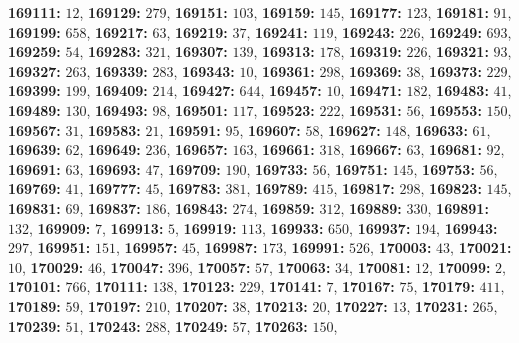 \textsf{\bfseries 169111:} $12$, \textsf{\bfseries 169129:} $279$, \textsf{\bfseries 169151:} $103$, \textsf{\bfseries 169159:} $145$, \textsf{\bfseries 169177:} $123$, \textsf{\bfseries 169181:} $91$, \textsf{\bfseries 169199:} $658$, \textsf{\bfseries 169217:} $63$, \textsf{\bfseries 169219:} $37$, \textsf{\bfseries 169241:} $119$, \textsf{\bfseries 169243:} $226$, \textsf{\bfseries 169249:} $693$, \textsf{\bfseries 169259:} $54$, \textsf{\bfseries 169283:} $321$, \textsf{\bfseries 169307:} $139$, \textsf{\bfseries 169313:} $178$, \textsf{\bfseries 169319:} $226$, \textsf{\bfseries 169321:} $93$, \textsf{\bfseries 169327:} $263$, \textsf{\bfseries 169339:} $283$, \textsf{\bfseries 169343:} $10$, \textsf{\bfseries 169361:} $298$, \textsf{\bfseries 169369:} $38$, \textsf{\bfseries 169373:} $229$, \textsf{\bfseries 169399:} $199$, \textsf{\bfseries 169409:} $214$, \textsf{\bfseries 169427:} $644$, \textsf{\bfseries 169457:} $10$, \textsf{\bfseries 169471:} $182$, \textsf{\bfseries 169483:} $41$, \textsf{\bfseries 169489:} $130$, \textsf{\bfseries 169493:} $98$, \textsf{\bfseries 169501:} $117$, \textsf{\bfseries 169523:} $222$, \textsf{\bfseries 169531:} $56$, \textsf{\bfseries 169553:} $150$, \textsf{\bfseries 169567:} $31$, \textsf{\bfseries 169583:} $21$, \textsf{\bfseries 169591:} $95$, \textsf{\bfseries 169607:} $58$, \textsf{\bfseries 169627:} $148$, \textsf{\bfseries 169633:} $61$, \textsf{\bfseries 169639:} $62$, \textsf{\bfseries 169649:} $236$, \textsf{\bfseries 169657:} $163$, \textsf{\bfseries 169661:} $318$, \textsf{\bfseries 169667:} $63$, \textsf{\bfseries 169681:} $92$, \textsf{\bfseries 169691:} $63$, \textsf{\bfseries 169693:} $47$, \textsf{\bfseries 169709:} $190$, \textsf{\bfseries 169733:} $56$, \textsf{\bfseries 169751:} $145$, \textsf{\bfseries 169753:} $56$, \textsf{\bfseries 169769:} $41$, \textsf{\bfseries 169777:} $45$, \textsf{\bfseries 169783:} $381$, \textsf{\bfseries 169789:} $415$, \textsf{\bfseries 169817:} $298$, \textsf{\bfseries 169823:} $145$, \textsf{\bfseries 169831:} $69$, \textsf{\bfseries 169837:} $186$, \textsf{\bfseries 169843:} $274$, \textsf{\bfseries 169859:} $312$, \textsf{\bfseries 169889:} $330$, \textsf{\bfseries 169891:} $132$, \textsf{\bfseries 169909:} $7$, \textsf{\bfseries 169913:} $5$, \textsf{\bfseries 169919:} $113$, \textsf{\bfseries 169933:} $650$, \textsf{\bfseries 169937:} $194$, \textsf{\bfseries 169943:} $297$, \textsf{\bfseries 169951:} $151$, \textsf{\bfseries 169957:} $45$, \textsf{\bfseries 169987:} $173$, \textsf{\bfseries 169991:} $526$, \textsf{\bfseries 170003:} $43$, \textsf{\bfseries 170021:} $10$, \textsf{\bfseries 170029:} $46$, \textsf{\bfseries 170047:} $396$, \textsf{\bfseries 170057:} $57$, \textsf{\bfseries 170063:} $34$, \textsf{\bfseries 170081:} $12$, \textsf{\bfseries 170099:} $2$, \textsf{\bfseries 170101:} $766$, \textsf{\bfseries 170111:} $138$, \textsf{\bfseries 170123:} $229$, \textsf{\bfseries 170141:} $7$, \textsf{\bfseries 170167:} $75$, \textsf{\bfseries 170179:} $411$, \textsf{\bfseries 170189:} $59$, \textsf{\bfseries 170197:} $210$, \textsf{\bfseries 170207:} $38$, \textsf{\bfseries 170213:} $20$, \textsf{\bfseries 170227:} $13$, \textsf{\bfseries 170231:} $265$, \textsf{\bfseries 170239:} $51$, \textsf{\bfseries 170243:} $288$, \textsf{\bfseries 170249:} $57$, \textsf{\bfseries 170263:} $150$, 
